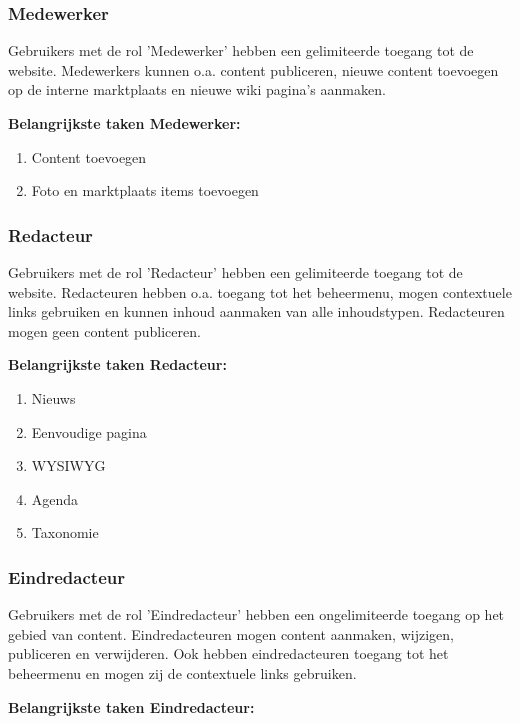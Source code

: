 \subsubsection{Medewerker}\label{medewerker}
Gebruikers met de rol 'Medewerker' hebben een gelimiteerde toegang tot de website. Medewerkers kunnen o.a. content publiceren, nieuwe content toevoegen op de interne marktplaats en nieuwe wiki pagina's aanmaken.

\textbf{Belangrijkste taken Medewerker:}

\begin{enumerate}
\item Content toevoegen
\item Foto en marktplaats  items toevoegen
\end{enumerate}

\subsubsection{Redacteur}\label{redacteur}
Gebruikers met de rol 'Redacteur' hebben een gelimiteerde toegang tot de website. Redacteuren hebben o.a. toegang tot het beheermenu, mogen contextuele links gebruiken en kunnen inhoud aanmaken van alle inhoudstypen. Redacteuren mogen geen content publiceren.

\textbf{Belangrijkste taken Redacteur:}

\begin{enumerate}
\item Nieuws 
\item Eenvoudige pagina
\item WYSIWYG 
\item Agenda 
\item Taxonomie 
\end{enumerate}

\subsubsection{Eindredacteur}\label{eindredacteur}
Gebruikers met de rol 'Eindredacteur' hebben een ongelimiteerde toegang op het gebied van content. Eindredacteuren mogen content aanmaken, wijzigen, publiceren en verwijderen. Ook hebben eindredacteuren toegang tot het beheermenu en mogen zij de contextuele links gebruiken.

\textbf{Belangrijkste taken Eindredacteur:}

